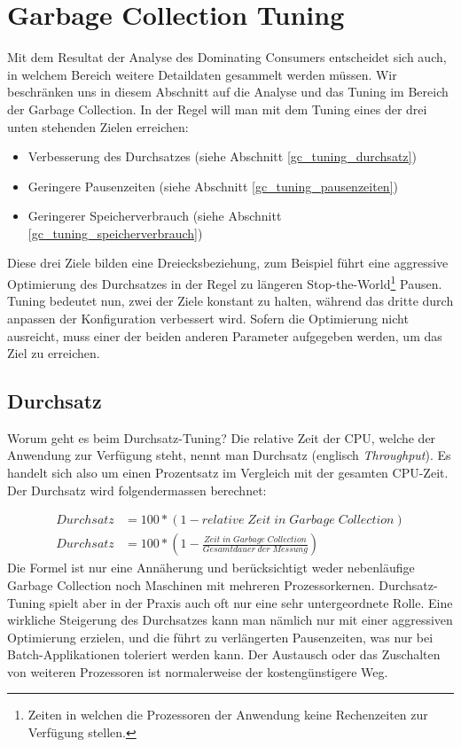 \section{Garbage Collection Tuning}\label{garbage_collection_tuning}
Mit dem Resultat der Analyse des Dominating Consumers entscheidet sich auch, in welchem Bereich weitere Detaildaten gesammelt werden müssen. Wir beschränken uns in diesem Abschnitt auf die Analyse und das Tuning im Bereich der Garbage Collection. In der Regel will man mit dem Tuning eines der drei unten stehenden Zielen erreichen\cite{langerkreftJavaCore}: 
\begin{itemize}
\item Verbesserung des Durchsatzes (siehe Abschnitt \ref{gc_tuning_durchsatz})
\item Geringere Pausenzeiten (siehe Abschnitt \ref{gc_tuning_pausenzeiten})
\item Geringerer Speicherverbrauch (siehe Abschnitt \ref{gc_tuning_speicherverbrauch})
\end{itemize}

Diese drei Ziele bilden eine Dreiecksbeziehung, zum Beispiel führt eine aggressive Optimierung des Durchsatzes in der Regel zu längeren Stop-the-World\footnote{Zeiten in welchen die Prozessoren der Anwendung keine Rechenzeiten zur Verfügung stellen.} Pausen. Tuning bedeutet nun, zwei der Ziele konstant zu halten, während das dritte durch anpassen der Konfiguration verbessert wird. Sofern die Optimierung nicht ausreicht, muss einer der beiden anderen Parameter aufgegeben werden, um das Ziel zu erreichen.


\subsection{Durchsatz\label{gc_tuning_durchsatz}}
Worum geht es beim Durchsatz-Tuning? Die relative Zeit der CPU, welche der Anwendung zur Verfügung steht, nennt man Durchsatz (englisch \textit{Throughput}). Es handelt sich also um einen Prozentsatz im Vergleich mit der gesamten CPU-Zeit. Der Durchsatz wird folgendermassen berechnet:

 \begin{align*}
         Durchsatz &= 100 * (1-relative\;Zeit\;in\;Garbage\;Collection)\\
         Durchsatz &= 100 * (1-\frac{Zeit\;in\;Garbage\;Collection}{Gesamtdauer\;der\;Messung})
 \end{align*}
Die Formel ist nur eine Annäherung und berücksichtigt weder nebenläufige Garbage Collection noch Maschinen mit mehreren Prozessorkernen. Durchsatz-Tuning spielt aber in der Praxis auch oft nur eine sehr untergeordnete Rolle\cite{langerkreftJavaCore}. Eine wirkliche Steigerung des Durchsatzes kann man nämlich nur mit einer aggressiven Optimierung erzielen, und die führt zu verlängerten Pausenzeiten, was nur bei Batch-Applikationen toleriert werden kann. Der Austausch oder das Zuschalten von weiteren Prozessoren ist normalerweise der kostengünstigere Weg.

